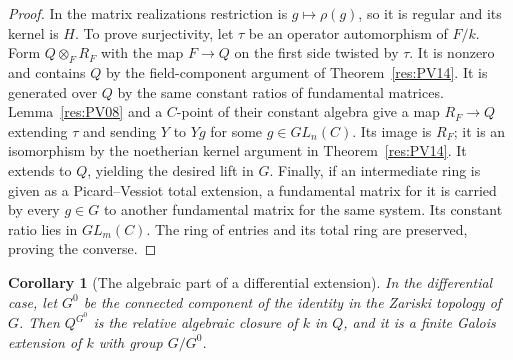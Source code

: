 \documentclass[11pt,oneside,openany]{book}
\newtheorem{corollary}[theorem]{Corollary}
\theoremstyle{definition}
\theoremstyle{remark}
\begin{document}
\begin{proof}
In the matrix realizations restriction is \(g\mapsto\rho(g)\),
so it is regular and its kernel is \(H\).
To prove surjectivity, let \(\tau\) be an operator
automorphism of \(F/k\). Form \(Q\otimes_F R_F\) with the
map \(F\to Q\) on the first side twisted by \(\tau\).
It is nonzero and contains \(Q\) by the field-component
argument of Theorem~\ref{res:PV14}. It is generated over
\(Q\) by the same constant ratios of fundamental matrices.
Lemma~\ref{res:PV08} and a \(C\)-point of their constant
algebra give a map \(R_F\to Q\) extending \(\tau\) and sending
\(Y\) to \(Yg\) for some \(g\in GL_n(C)\). Its image is
\(R_F\); it is an isomorphism by the noetherian kernel argument
in Theorem~\ref{res:PV14}. It extends to \(Q\), yielding
the desired lift in \(G\). Finally, if an intermediate ring is
given as a Picard--Vessiot total extension, a fundamental
matrix for it is carried by every \(g\in G\) to another
fundamental matrix for the same system. Its constant ratio
lies in \(GL_m(C)\). The ring of entries and its total ring
are preserved, proving the converse.
\end{proof}

\begin{corollary}[The algebraic part of a differential extension]
\label{res:PV20}
In the differential case, let \(G^0\) be the connected component
of the identity in the Zariski topology of \(G\). Then \(Q^{G^0}\)
is the relative algebraic closure of \(k\) in \(Q\),
and it is a finite Galois extension of \(k\) with group \(G/G^0\).
\end{corollary}
\end{document}
